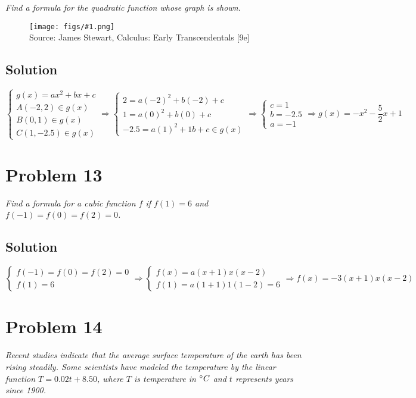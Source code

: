 \documentclass[11pt]{article}
\newcommand{\soln}{\subsection*}
\newcommand{\qn}{\textit}
\newcommand{\imagesource}[1]{{\footnotesize Source: #1}}
\newcommand{\imgqn}[1]{
	\begin{figure}[H]
		\centering
		\texttt{[image: figs/\#1.png]}\\
		\imagesource{James Stewart, Calculus: Early Transcendentals [9e]}
	\end{figure}
}
\begin{document}
\qn{Find a formula for the quadratic function whose graph is shown.}

\imgqn{1.2.12}

\soln{Solution}
\begin{equation*}
	\begin{cases}
		g(x)=ax^2+bx+c \\
		A(-2,2) \in g(x) \\
		B(0,1) \in g(x) \\
		C(1,-2.5) \in g(x) 
	\end{cases}
	\Rightarrow
	\begin{cases}
		2=a(-2)^2+b(-2)+c \\
		1=a(0)^2+b(0)+c \\
		-2.5=a(1)^2+1b+c \in g(x) 
	\end{cases}
	\Rightarrow
	\begin{cases}
		c=1 \\
		b=-2.5 \\
		a=-1
	\end{cases}
	\Rightarrow
	g(x)=-x^2-\frac{5}{2}x+1
\end{equation*}

\section*{Problem 13}

\qn{Find a formula for a cubic function $f$ if $f(1)=6$ and $f(-1)=f(0)=f(2)=0$.}

\soln{Solution}
\begin{equation*}
	\begin{cases}
		f(-1)=f(0)=f(2)=0 \\
		f(1)=6
	\end{cases}
	\Rightarrow
	\begin{cases}
		f(x)=a(x+1)x(x-2) \\
		f(1)=a(1+1)1(1-2)=6
	\end{cases}
	\Rightarrow
	f(x)=-3(x+1)x(x-2)
\end{equation*}

\section*{Problem 14}

\qn{Recent studies indicate that the average surface temperature of the earth has been rising steadily. Some scientists have modeled the temperature by the linear function $T=0.02t+8.50$, where $T$ is temperature in $\degree C$ and $t$ represents years since 1900.}
\end{document}

